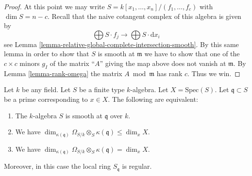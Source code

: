 \begin{proof}
\medskip\noindent
At this point we may write $S = k[x_1, \ldots, x_n]/(f_1, \ldots, f_c)$
with $\dim S = n - c$. Recall that the naive cotangent complex
of this algebra is given by
$$
\bigoplus S \cdot f_j
\to
\bigoplus S \cdot \text{d}x_i
$$
see Lemma \ref{lemma-relative-global-complete-intersection-smooth}.
By this same lemma in order to show that $S$ is smooth at
$\mathfrak m$ we have to show that one of the $c \times c$
minors $g_I$ of the matrix ``$A$'' giving the map above
does not vanish at $\mathfrak m$. By Lemma \ref{lemma-rank-omega}
the matrix $A \bmod \mathfrak m$ has rank $c$. Thus we win.
\end{proof}

\begin{lemma}
\label{lemma-characterize-smooth-over-field}
Let $k$ be any field.
Let $S$ be a finite type $k$-algebra.
Let $X = \text{Spec}(S)$.
Let $\mathfrak q \subset S$ be a prime
corresponding to $x \in X$.
The following are equivalent:
\begin{enumerate}
\item The $k$-algebra $S$ is smooth at $\mathfrak q$ over $k$.
\item We have
$\dim_{\kappa(\mathfrak q)} \Omega_{S/k} \otimes_S \kappa(\mathfrak q)
\leq \dim_x X$.
\item We have
$\dim_{\kappa(\mathfrak q)} \Omega_{S/k} \otimes_S \kappa(\mathfrak q)
= \dim_x X$.
\end{enumerate}
Moreover, in this case the local ring $S_{\mathfrak q}$ is regular.
\end{lemma}

